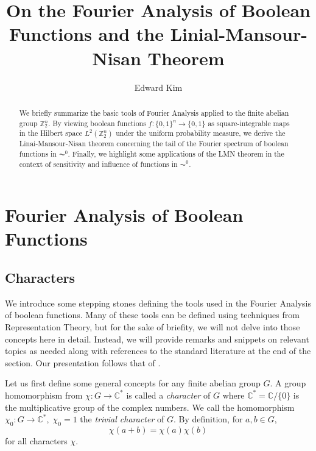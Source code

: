 \documentclass{amsart}
\theoremstyle{definition}
\theoremstyle{remark}
\numberwithin{equation}{section}
\theoremstyle{remark}
\begin{document}
\title{On the Fourier Analysis of Boolean Functions and the Linial-Mansour-Nisan Theorem}

\author{Edward Kim}

\begin{abstract}
  We briefly summarize the basic tools of Fourier Analysis applied to the finite abelian group $\mathbb{Z}_2^n$. By viewing boolean functions $f:\{0,1\}^n \rightarrow \{0,1\}$ as square-integrable maps in the Hilbert space $L^2(\mathbb{Z}_2^n)$ under the uniform probability measure, we derive the Linai-Mansour-Nisan theorem concerning the tail of the Fourier spectrum of boolean functions in $\AC^0$. Finally, we highlight some applications of the LMN theorem in the context of sensitivity and influence of functions in $\AC^0$.
\end{abstract}

\maketitle

\section{Fourier Analysis of Boolean Functions}

\subsection{Characters}

We introduce some stepping stones defining the tools used in the Fourier Analysis of boolean functions. Many of these tools can be defined using techniques from Representation Theory, but for the sake of briefity, we will not delve into those concepts here in detail. Instead, we will provide remarks and snippets on relevant topics as needed along with references to the standard literature at the end of the section. Our presentation follows that of \cite{hatami}. \newline

Let us first define some general concepts for any finite abelian group $G$. A group homomorphism from $\chi: G \rightarrow \mathbb{C}^*$ is called a \emph{character} of $G$ where $\mathbb{C}^* = \mathbb{C}/\{0\}$ is the multiplicative group of the complex numbers. We call the homomorphism $\chi_0:G \rightarrow \mathbb{C}^*, \; \chi_0 = 1$ the \emph{trivial character} of $G$. By definition, for $a,b \in G$,
\begin{equation} \label{homo}
\chi(a + b) = \chi(a)\chi(b)
\end{equation}
for all characters $\chi$. \newline
\end{document}
